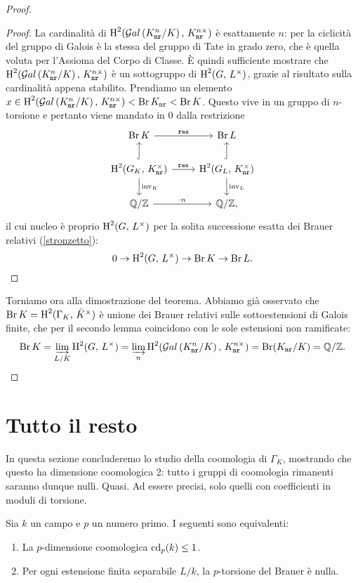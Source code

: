 \begin{proof}
\begin{proof}
	La cardinalità di $ \operatorname{H}^2(\mathcal{G}al\left( K_\mathtt{nr}^n/K \right),\, K_\mathtt{nr}^{n\times}) $ è esattamente $ n $: per la ciclicità del gruppo di Galois è la stessa del gruppo di Tate in grado zero, che è quella voluta per l'Assioma del Corpo di Classe. È quindi sufficiente mostrare che $ \operatorname{H}^2(\mathcal{G}al\left( K_\mathtt{nr}^n/K \right),\, K_\mathtt{nr}^{n\times}) $ è un sottogruppo di $ \operatorname{H}^2(G,\, L^\times ) $, grazie al risultato sulla cardinalità appena stabilito.
	Prendiamo un elemento $ x \in \operatorname{H}^2(\mathcal{G}al\left( K_\mathtt{nr}^n/K \right),\, K_\mathtt{nr}^{n\times}) < \operatorname{Br} K_\mathtt{nr} < \operatorname{Br} K $. Questo vive in un gruppo di $ n $-torsione e pertanto viene mandato in $ 0 $ dalla restrizione
	\[ \begin{tikzcd}
	\Br \K \rar["\Res"]
	& \Br L \\
	\HH^2(G_\K, \, \knr^\times) \rar["\Res"] \dar["\inv_\K"] \arrow[hook]{u}
	& \HH^2(G_L, \, \knr^\times) \dar["\inv_L"] \arrow[hook]{u} \\
	\Q/\Z \rar["\cdot n"]
	& \Q/\Z,
	\end{tikzcd} \]
	il cui nucleo è proprio $ \operatorname{H}^2(G, \, L^\times) $ per la solita successione esatta dei Brauer relativi (\ref{stronzetto}):
	\[ 0 \to \operatorname{H}^2(G, \, L^\times) \to \operatorname{Br} K \to \operatorname{Br} L. \qedhere \]
\end{proof}

Torniamo ora alla dimostrazione del teorema. Abbiamo già osservato che $ \operatorname{Br} K = \operatorname{H}^2(\Gamma_K, \, \bar{K}^\times) $ è unione dei Brauer relativi sulle sottoestensioni di Galois finite, che per il secondo lemma coincidono con le sole estensioni non ramificate:
\[ \operatorname{Br} K = \varinjlim_{L/K} \operatorname{H}^2(G, \, L^\times) = \varinjlim_{n} \operatorname{H}^2(\mathcal{G}al\left( K_\mathtt{nr}^n/K \right),\, K_\mathtt{nr}^{n\times}) = \operatorname{Br} (K_\mathtt{nr} /K) = \mathbb{Q}/\mathbb{Z}. \qedhere \]

\end{proof}

\section{Tutto il resto}
In questa sezione concluderemo lo studio della coomologia di $ \Gamma_K $, mostrando che questo ha dimensione coomologica 2: tutto i gruppi di coomologia rimanenti saranno dunque nulli. Quasi. Ad essere precisi, solo quelli con coefficienti in moduli di torsione.

\begin{lemma}
	Sia $ k $ un campo e $ p $ un numero primo. I seguenti sono equivalenti:
	\begin{enumerate}[label= \roman*.]
		\item La $ p $-dimensione coomologica $ \operatorname{cd}_p(k) \leq 1 $.
		\item Per ogni estensione finita separabile $ L/k $, la $ p $-torsione del Brauer è nulla.
	\end{enumerate}
\end{lemma}

